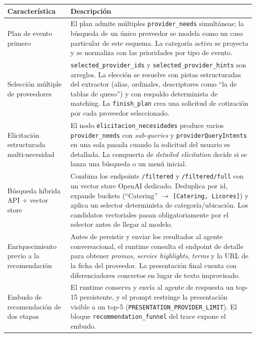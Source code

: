 \documentclass[11pt,a4paper]{article}
\begin{document}
\begin{longtable}{p{4.6cm}p{10.8cm}}
\toprule
\textbf{Característica} & \textbf{Descripción} \\
\midrule
\endhead

Plan de evento primero &
El plan admite múltiples \texttt{provider\_needs} simultáneas; la
búsqueda de un único proveedor se modela como un caso particular de
este esquema. La categoría activa se proyecta y se normaliza con las
prioridades por tipo de evento. \\

Selección múltiple de proveedores &
\texttt{selected\_provider\_ids} y \texttt{selected\_provider\_hints}
son arreglos. La elección se resuelve con pistas estructuradas del
extractor (alias, ordinales, descriptores como ``la de tablas de
queso'') y con respaldo determinista de matching. La
\texttt{finish\_plan} crea una solicitud de cotización por cada
proveedor seleccionado. \\

Elicitación estructurada multi-necesidad &
El nodo \texttt{elicitacion\_necesidades} produce varios
\texttt{provider\_needs} con \emph{sub-queries} y
\texttt{providerQueryIntents} en una sola pasada cuando la solicitud
del usuario es detallada. La compuerta de \emph{detailed elicitation}
decide si se lanza una búsqueda o un menú inicial. \\

Búsqueda híbrida API + vector store &
Combina los endpoints \texttt{/filtered} y \texttt{/filtered/full} con
un vector store OpenAI dedicado. Deduplica por id, expande buckets
(``Catering'' $\to$ \texttt{[Catering, Licores]}) y aplica un selector
determinista de categoría/ubicación. Los candidatos vectoriales
pasan obligatoriamente por el selector antes de llegar al modelo. \\

Enriquecimiento previo a la recomendación &
Antes de persistir y enviar los resultados al agente conversacional,
el runtime consulta el endpoint de detalle para obtener
\textit{promos}, \textit{service highlights}, \textit{terms} y la URL
de la ficha del proveedor. La presentación final cuenta con
diferenciadores concretos en lugar de texto improvisado. \\

Embudo de recomendación de dos etapas &
El runtime conserva y envía al agente de respuesta un top-15
persistente, y el prompt restringe la presentación visible a un
top-5 (\texttt{PRESENTATION\_PROVIDER\_LIMIT}). El bloque
\texttt{recommendation\_funnel} del trace expone el embudo. \\


\end{longtable}
\end{document}
